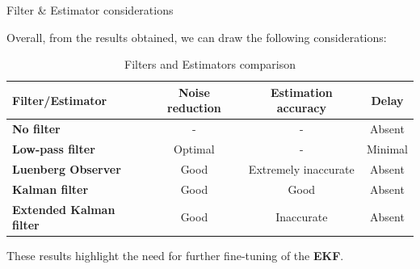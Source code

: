 \begin{frame}{Filter \& Estimator considerations}

    Overall, from the results obtained, we can draw the following considerations:

    \begin{table}[H]
        \centering

        \begin{tabular}{|l|c|c|c|}
            \hline
            \textbf{Filter/Estimator}       & \textbf{Noise reduction} & \textbf{Estimation accuracy} & \textbf{Delay} \\ \hline
            \textbf{No filter}              & -                        & -                            & Absent         \\ \hline
            \textbf{Low-pass filter}        & Optimal                  & -                            & Minimal        \\ \hline
            \textbf{Luenberg Observer}      & Good                     & Extremely inaccurate         & Absent         \\ \hline
            \textbf{Kalman filter}          & Good                     & Good                         & Absent         \\ \hline
            \textbf{Extended Kalman filter} & Good                     & Inaccurate                   & Absent         \\ \hline
        \end{tabular}
        \caption{Filters and Estimators comparison}
    \end{table}

    \vspace{9pt}

    These results highlight the need for further fine-tuning of the \textbf{EKF}.

\end{frame}